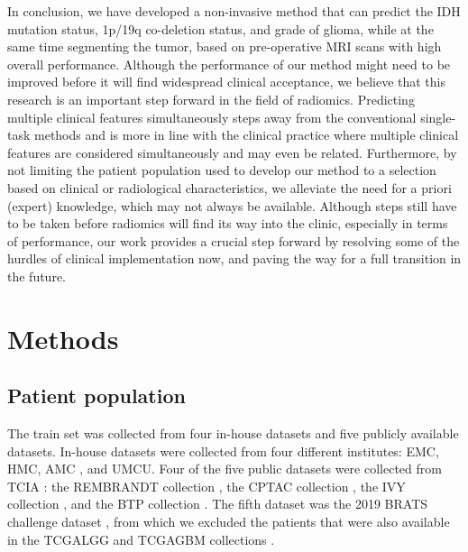 In conclusion, we have developed a non-invasive method that can predict the IDH mutation status, 1p/19q co-deletion status, and grade of glioma, while at the same time segmenting the tumor, based on pre-operative \gls{MRI} scans with high overall performance.
Although the performance of our method might need to be improved before it will find widespread clinical acceptance, we believe that this research is an important step forward in the field of radiomics.
Predicting multiple clinical features simultaneously steps away from the conventional single-task methods and is more in line with the clinical practice where multiple clinical features are considered simultaneously and may even be related.
Furthermore, by not limiting the patient population used to develop our method to a selection based on clinical or radiological characteristics, we alleviate the need for a priori (expert) knowledge, which may not always be available.
Although steps still have to be taken before radiomics will find its way into the clinic, especially in terms of performance, our work provides a crucial step forward by resolving some of the hurdles of clinical implementation now, and paving the way for a full transition in the future.

\section{Methods}

\subsection{Patient population}

The train set was collected from four in-house datasets and five publicly available datasets.
In-house datasets were collected from four different institutes: \gls{EMC}, \gls{HMC}, \gls{AMC} \autocite{visser2019segmentation}, and \gls{UMCU}.
Four of the five public datasets were collected from \gls{TCIA} \autocite{clark2013cancer}:  the \gls{REMBRANDT} collection \autocite{scarpace2015radiology}, the \gls{CPTAC} collection \autocite{cptac2018radiology}, the \gls{IVY} collection \autocite{nameeta2016radiology, puchalski2018ivygap}, and the \gls{BTP} collection \autocite{schmainda2018radiology}.
The fifth dataset was the 2019 \gls{BRATS} challenge dataset \autocite{menze2015brats, bakas2017brats, bakas2018brats}, from which we excluded the patients that were also available in the \gls{TCGALGG} and \gls{TCGAGBM} collections \autocite{pedano2016radiology, scarpace2016radiology}.

